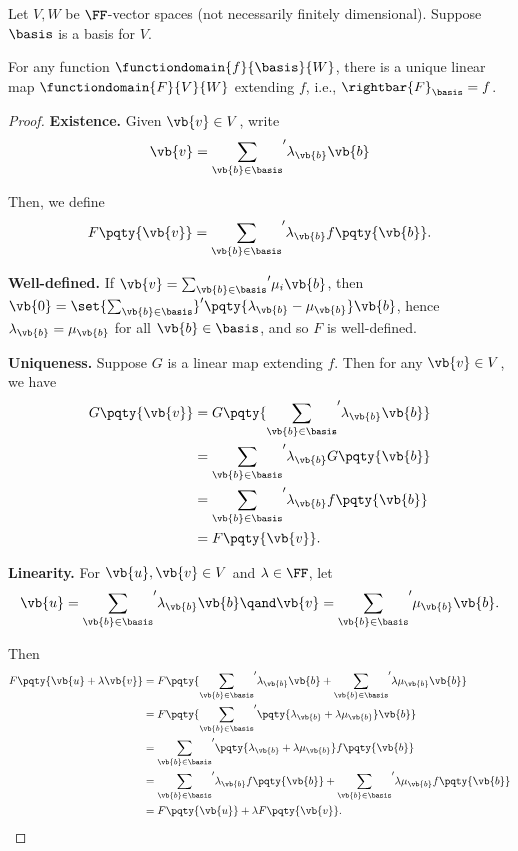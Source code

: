 \begin{proposition}
    \label{prop:linear-map-is-determined-by-basis}%
    Let \(V, W\) be \(\FF\)-vector spaces (not necessarily finitely dimensional). Suppose \(\basis\) is a basis for \(V\).

    For any function \(\functiondomain{f}{\basis}{W}\), there is a unique linear map \(\functiondomain{F}{V}{W}\) extending \(f\), i.e., \(\rightbar{F}_{\basis} = f\).
\end{proposition}

\begin{proof}
    \textbf{Existence.} Given \(\vb{v} \in V\), write
    \[
        \vb{v} = {\sum_{\vb{b} \in \basis}}' \lambda_{\vb{b}} \vb{b}
    \]

    Then, we define
    \[
        F\pqty{\vb{v}} = {\sum_{\vb{b} \in \basis}}' \lambda_{\vb{b}} f\pqty{\vb{b}}.
    \]

    \textbf{Well-defined.} If \(\vb{v} = {\sum_{\vb{b} \in \basis}}' \mu_i \vb{b}\), then \(\vb{0} = \set{\sum_{\vb{b} \in \basis}}' \pqty{\lambda_{\vb{b}} - \mu_{\vb{b}}} \vb{b}\), hence \(\lambda_{\vb{b}} = \mu_{\vb{b}}\) for all \(\vb{b} \in \basis\), and so \(F\) is well-defined.

    \textbf{Uniqueness.} Suppose \(G\) is a linear map extending \(f\). Then for any \(\vb{v} \in V\), we have
    \begin{align*}
        G\pqty{\vb{v}} &= G\pqty{{\sum_{\vb{b} \in \basis}}' \lambda_{\vb{b}} \vb{b}} \\
        &= {\sum_{\vb{b} \in \basis}}' \lambda_{\vb{b}} G\pqty{\vb{b}} \\
        &= {\sum_{\vb{b} \in \basis}}' \lambda_{\vb{b}} f\pqty{\vb{b}} \\
        &= F\pqty{\vb{v}}.
    \end{align*}

    \textbf{Linearity.} For \(\vb{u}, \vb{v} \in V\) and \(\lambda \in \FF\), let
    \[
        \vb{u} = {\sum_{\vb{b} \in \basis}}' \lambda_{\vb{b}} \vb{b} \qand \vb{v} = {\sum_{\vb{b} \in \basis}}' \mu_{\vb{b}} \vb{b}.
    \]

    Then
    \begin{align*}
        F\pqty{\vb{u} + \lambda \vb{v}} &= F\pqty{{\sum_{\vb{b} \in \basis}}' \lambda_{\vb{b}} \vb{b} + {\sum_{\vb{b} \in \basis}}' \lambda \mu_{\vb{b}} \vb{b}} \\
        &= F\pqty{{\sum_{\vb{b} \in \basis}}' \pqty{\lambda_{\vb{b}} + \lambda \mu_{\vb{b}}} \vb{b}} \\
        &= {\sum_{\vb{b} \in \basis}}' \pqty{\lambda_{\vb{b}} + \lambda \mu_{\vb{b}}} f\pqty{\vb{b}} \\
        &= {\sum_{\vb{b} \in \basis}}' \lambda_{\vb{b}} f\pqty{\vb{b}} + {\sum_{\vb{b} \in \basis}}' \lambda \mu_{\vb{b}} f\pqty{\vb{b}} \\
        &= F\pqty{\vb{u}} + \lambda F\pqty{\vb{v}}.
    \end{align*}
\end{proof}

